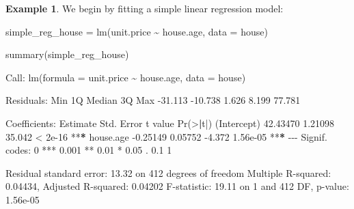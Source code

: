 \documentclass[
  11pt,
]{book}
\makeatletter
\newenvironment{Shaded}{}{}
\newcommand{\AttributeTok}[1]{#1}
\newcommand{\DecValTok}[1]{#1}
\newcommand{\ErrorTok}[1]{\textcolor[rgb]{0.21,0.21,0.21}{\textbf{#1}}}
\newcommand{\FloatTok}[1]{#1}
\newcommand{\FunctionTok}[1]{#1}
\newcommand{\NormalTok}[1]{#1}
\newcommand{\OtherTok}[1]{\textcolor[rgb]{0.39,0.39,0.39}{#1}}
\newcommand{\SpecialCharTok}[1]{\textcolor[rgb]{0.39,0.39,0.39}{#1}}
\newcommand{\StringTok}[1]{\textcolor[rgb]{0.39,0.39,0.39}{#1}}
\newenvironment{kframe}{%
\medskip{}
\setlength{\fboxsep}{.8em}
 \def\at@end@of@kframe{}%
 \ifinner\ifhmode%
  \def\at@end@of@kframe{\end{minipage}}%
  \begin{minipage}{\columnwidth}%
 \fi\fi%
 \def\FrameCommand##1{\hskip\@totalleftmargin \hskip-\fboxsep
 \colorbox{shadecolor}{##1}\hskip-\fboxsep
     \hskip-\linewidth \hskip-\@totalleftmargin \hskip\columnwidth}%
 \MakeFramed {\advance\hsize-\width
   \@totalleftmargin\z@ \linewidth\hsize
   \@setminipage}}%
 {\par\unskip\endMakeFramed%
 \at@end@of@kframe}
\renewenvironment{Shaded}{\begin{kframe}}{\end{kframe}}
\theoremstyle{definition}
\theoremstyle{definition}
\newtheorem{example}{Example}[chapter]
\theoremstyle{definition}
\theoremstyle{definition}
\theoremstyle{remark}
\makeatother
\begin{document}
\begin{example}
We begin by fitting a simple linear regression model:

\begin{Shaded}
\begin{Highlighting}[]
\NormalTok{simple\_reg\_house }\OtherTok{=} \FunctionTok{lm}\NormalTok{(unit.price }\SpecialCharTok{\textasciitilde{}}\NormalTok{ house.age, }\AttributeTok{data =}\NormalTok{ house)}

\FunctionTok{summary}\NormalTok{(simple\_reg\_house)}
   
\NormalTok{   Call}\SpecialCharTok{:}
   \FunctionTok{lm}\NormalTok{(}\AttributeTok{formula =}\NormalTok{ unit.price }\SpecialCharTok{\textasciitilde{}}\NormalTok{ house.age, }\AttributeTok{data =}\NormalTok{ house)}
   
\NormalTok{   Residuals}\SpecialCharTok{:}
\NormalTok{       Min      }\DecValTok{1}\NormalTok{Q  Median      }\DecValTok{3}\NormalTok{Q     Max }
   \SpecialCharTok{{-}}\FloatTok{31.113} \SpecialCharTok{{-}}\FloatTok{10.738}   \FloatTok{1.626}   \FloatTok{8.199}  \FloatTok{77.781} 
   
\NormalTok{   Coefficients}\SpecialCharTok{:}
\NormalTok{               Estimate Std. Error t value }\FunctionTok{Pr}\NormalTok{(}\SpecialCharTok{\textgreater{}}\ErrorTok{|}\NormalTok{t}\SpecialCharTok{|}\NormalTok{)    }
\NormalTok{   (Intercept) }\FloatTok{42.43470}    \FloatTok{1.21098}  \FloatTok{35.042}  \SpecialCharTok{\textless{}} \FloatTok{2e{-}16} \SpecialCharTok{**}\ErrorTok{*}
\NormalTok{   house.age   }\SpecialCharTok{{-}}\FloatTok{0.25149}    \FloatTok{0.05752}  \SpecialCharTok{{-}}\FloatTok{4.372} \FloatTok{1.56e{-}05} \SpecialCharTok{**}\ErrorTok{*}
   \SpecialCharTok{{-}{-}{-}}
\NormalTok{   Signif. codes}\SpecialCharTok{:}  \DecValTok{0} \StringTok{\textquotesingle{}***\textquotesingle{}} \FloatTok{0.001} \StringTok{\textquotesingle{}**\textquotesingle{}} \FloatTok{0.01} \StringTok{\textquotesingle{}*\textquotesingle{}} \FloatTok{0.05} \StringTok{\textquotesingle{}.\textquotesingle{}} \FloatTok{0.1} \StringTok{\textquotesingle{} \textquotesingle{}} \DecValTok{1}
   
\NormalTok{   Residual standard error}\SpecialCharTok{:} \FloatTok{13.32}\NormalTok{ on }\DecValTok{412}\NormalTok{ degrees of freedom}
\NormalTok{   Multiple R}\SpecialCharTok{{-}}\NormalTok{squared}\SpecialCharTok{:}  \FloatTok{0.04434}\NormalTok{,    Adjusted R}\SpecialCharTok{{-}}\NormalTok{squared}\SpecialCharTok{:}  \FloatTok{0.04202} 
\NormalTok{   F}\SpecialCharTok{{-}}\NormalTok{statistic}\SpecialCharTok{:} \FloatTok{19.11}\NormalTok{ on }\DecValTok{1}\NormalTok{ and }\DecValTok{412}\NormalTok{ DF,  p}\SpecialCharTok{{-}}\NormalTok{value}\SpecialCharTok{:} \FloatTok{1.56e{-}05}
\end{Highlighting}
\end{Shaded}


\end{example}
\end{document}
